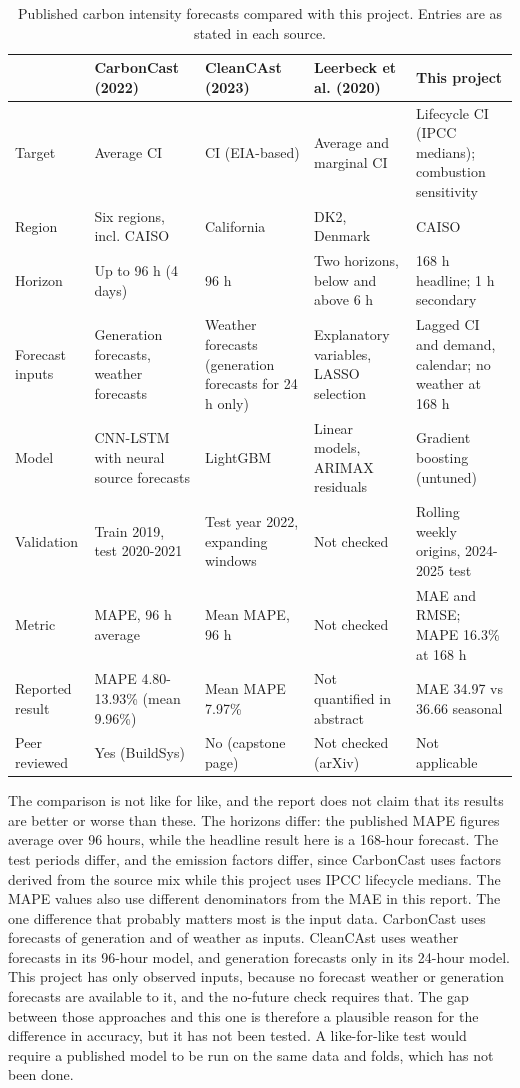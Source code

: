 \documentclass[10pt,journal,compsoc]{IEEEtran}
\begin{document}
\begin{table}[t]
\caption{Published carbon intensity forecasts compared with this project. Entries are as stated in each source.}
\label{tab:published}
\centering
\small
\begin{tabular}{@{}p{2.6cm}p{2.9cm}p{2.9cm}p{2.9cm}p{4.2cm}@{}}
\toprule
 & CarbonCast (2022) & CleanCAst (2023) & Leerbeck et al. (2020) & This project \\
\midrule
Target & Average CI & CI (EIA-based) & Average and marginal CI & Lifecycle CI (IPCC medians); combustion sensitivity \\
Region & Six regions, incl. CAISO & California & DK2, Denmark & CAISO \\
Horizon & Up to 96 h (4 days) & 96 h & Two horizons, below and above 6 h & 168 h headline; 1 h secondary \\
Forecast inputs & Generation forecasts, weather forecasts & Weather forecasts (generation forecasts for 24 h only) & Explanatory variables, LASSO selection & Lagged CI and demand, calendar; no weather at 168 h \\
Model & CNN-LSTM with neural source forecasts & LightGBM & Linear models, ARIMAX residuals & Gradient boosting (untuned) \\
Validation & Train 2019, test 2020-2021 & Test year 2022, expanding windows & Not checked & Rolling weekly origins, 2024-2025 test \\
Metric & MAPE, 96 h average & Mean MAPE, 96 h & Not checked & MAE and RMSE; MAPE 16.3\% at 168 h \\
Reported result & MAPE 4.80-13.93\% (mean 9.96\%) & Mean MAPE 7.97\% & Not quantified in abstract & MAE 34.97 vs 36.66 seasonal \\
Peer reviewed & Yes (BuildSys) & No (capstone page) & Not checked (arXiv) & Not applicable \\
\bottomrule
\end{tabular}
\end{table}

The comparison is not like for like, and the report does not claim that its results are better or worse than these. The horizons differ: the published MAPE figures average over 96 hours, while the headline result here is a 168-hour forecast. The test periods differ, and the emission factors differ, since CarbonCast uses factors derived from the source mix while this project uses IPCC lifecycle medians. The MAPE values also use different denominators from the MAE in this report. The one difference that probably matters most is the input data. CarbonCast uses forecasts of generation and of weather as inputs. CleanCAst uses weather forecasts in its 96-hour model, and generation forecasts only in its 24-hour model. This project has only observed inputs, because no forecast weather or generation forecasts are available to it, and the no-future check requires that. The gap between those approaches and this one is therefore a plausible reason for the difference in accuracy, but it has not been tested. A like-for-like test would require a published model to be run on the same data and folds, which has not been done.
\end{document}
